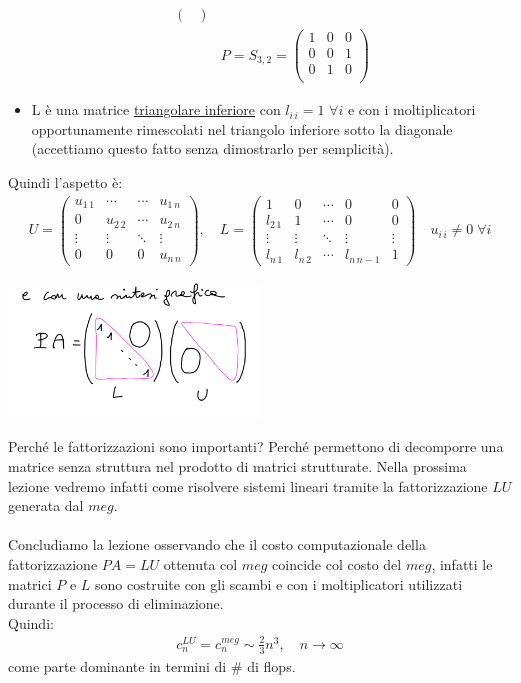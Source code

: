 \documentclass[12pt,a4paper]{article}
\begin{document}
\begin{itemize}
\[\begin{split}
\begin{pmatrix}
		\end{pmatrix}
	\\
	& P=S_{3,2}=
		\begin{pmatrix}
		1 & 0 & 0 \\
		0 & 0 & 1 \\
		0 & 1 & 0 \\
		\end{pmatrix}
\end{split} \]
\item L è una matrice \uline{triangolare inferiore} con $l_{i\,i}=1$ $\forall i$ e con i moltiplicatori opportunamente rimescolati nel triangolo inferiore sotto la diagonale (accettiamo questo fatto senza dimostrarlo per semplicità).
\end{itemize}
Quindi l'aspetto è:
\[ \begin{split}
	U=
		\begin{pmatrix}
		u_{1\,1} & \cdots & \cdots & u_{1\,n} \\
		0 & u_{2\,2} & \cdots & u_{2\,n} \\
		\vdots & \vdots & \ddots & \vdots \\
		0 & 0 & 0 & u_{n\,n}
		\end{pmatrix}
	, \quad L=
		\begin{pmatrix}
		1 & 0 & \cdots & 0 & 0 \\
		l_{2\,1} & 1 & \cdots & 0 & 0 \\
		\vdots & \vdots & \ddots & \vdots & \vdots \\
		l_{n\,1} & l_{n\,2} & \cdots & l_{n\,n-1} & 1 
		\end{pmatrix}
	\quad u_{i\,i} \neq 0 \; \forall i
\end{split} \]
\begin{center}
\includegraphics[width = 0.5\textwidth]{lez22_pag19.png}
\end{center}
Perché le fattorizzazioni sono importanti? Perché permettono di decomporre una matrice senza struttura nel prodotto di matrici strutturate. Nella prossima lezione vedremo infatti come risolvere sistemi lineari tramite la fattorizzazione $LU$ generata dal $meg$.\\\\
Concludiamo la lezione osservando che il costo computazionale della fattorizzazione $PA=LU$ ottenuta col $meg$ coincide col costo del $meg$, infatti le matrici $P$ e $L$ sono costruite con gli scambi e con i moltiplicatori utilizzati durante il processo di eliminazione.\\
Quindi:
\[ \begin{split}
	c_n^{LU}=c_n^{meg}\sim\frac{2}{3}n^3, \quad n\to \infty
\end{split} \]
come parte dominante in termini di \# di flops.
\end{document}
